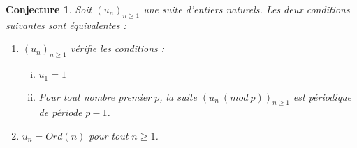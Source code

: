 \documentclass[12pt]{article}
\newtheorem{conjecture}[definition]{{\bf Conjecture}}
\begin{document}
\begin{conjecture}
Soit $(u_n)_{n\geq 1}$ une suite d'entiers naturels.  
Les deux conditions suivantes sont \'equivalentes :
\begin{enumerate}[1)]
\item $(u_n)_{n\geq 1}$  v\'erifie les conditions :
\begin{enumerate}[i)]
\item $u_1=1$
\item Pour tout nombre premier $p$, la suite $(u_n \ (mod \ p))_{n\geq 1}$ est 
p\'eriodique de p\'eriode $p-1$.
\end{enumerate} 
\item $u_n = Ord(n)$ pour tout  $n\geq 1$.  
\end{enumerate} 
\end{conjecture}


 



\end{document}
